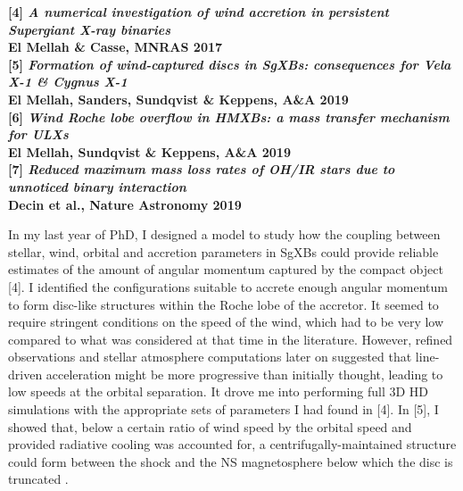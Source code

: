 \documentclass[11pt,onecolumn]{article}
\makeatletter
\newcommand{\sgxs}{SgXBs\xspace}
\newcommand*{\hmxb}{HMXB\@\xspace}
\newcommand*{\ns}{NS\@\xspace}
\makeatother
\begin{document}
\footnotesize
\textbf{[4] \textit{A numerical investigation of wind accretion in persistent Supergiant X-ray binaries}}\\
\hspace*{16pt}\textbf{El Mellah \& Casse, MNRAS 2017}\\
\textbf{[5] \textit{Formation of wind-captured discs in SgXBs: consequences for Vela X-1 \& Cygnus X-1}}\\
\hspace*{16pt}\textbf{El Mellah, Sanders, Sundqvist \& Keppens, A\&A 2019}\\
\textbf{[6] \textit{Wind Roche lobe overflow in HMXBs: a mass transfer mechanism for ULXs}}\\
\hspace*{16pt}\textbf{El Mellah, Sundqvist \& Keppens, A\&A 2019}\\
\textbf{[7] \textit{Reduced maximum mass loss rates of OH/IR stars due to unnoticed binary interaction}}\\
\hspace*{16pt}\textbf{Decin et al., Nature Astronomy 2019}\\

\normalsize


In my last year of PhD, I designed a model to study how the coupling between stellar, wind, orbital and accretion parameters in \sgxs could provide reliable estimates of the amount of angular momentum captured by the compact object [4]. I identified the configurations suitable to accrete enough angular momentum to form disc-like structures within the Roche lobe of the accretor. It seemed to require stringent conditions on the speed of the wind, which had to be very low compared to what was considered at that time in the literature. However, refined observations and stellar atmosphere computations later on suggested that line-driven acceleration might be more progressive than initially thought, leading to low speeds at the orbital separation. It drove me into performing full 3D HD simulations with the appropriate sets of parameters I had found in [4]. In [5], I showed that, below a certain ratio of wind speed by the orbital speed and provided radiative cooling was accounted for, a centrifugally-maintained structure could form between the shock and the \ns magnetosphere below which the disc is truncated \citep[see Figure\,\ref{fig:disc}][]{Ghosh1979}. 
\end{document}

